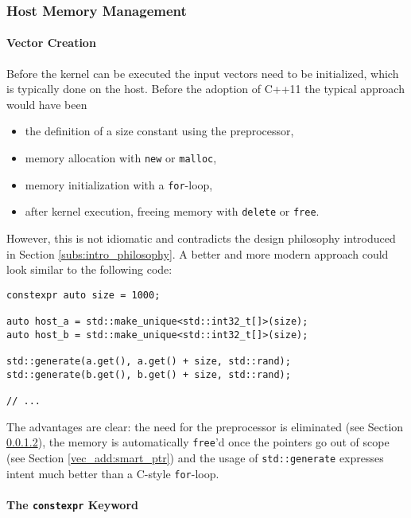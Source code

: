 \subsubsection{Host Memory Management}

\paragraph{Vector Creation}

Before the kernel can be executed the input vectors need to be initialized, which is typically done on the host. Before the adoption of C++11 the typical approach would have been
\begin{itemize}
\item the definition of a size constant using the preprocessor,
\item memory allocation with \texttt{new} or \texttt{malloc},
\item memory initialization with a \texttt{for}-loop,
\item after kernel execution, freeing memory with \texttt{delete} or \texttt{free}.
\end{itemize}

However, this is not idiomatic and contradicts the design philosophy introduced in Section \ref{subs:intro_philosophy}. A better and more modern approach could look similar to the following code:

\begin{lstlisting}
constexpr auto size = 1000;

auto host_a = std::make_unique<std::int32_t[]>(size);
auto host_b = std::make_unique<std::int32_t[]>(size);

std::generate(a.get(), a.get() + size, std::rand);
std::generate(b.get(), b.get() + size, std::rand);

// ...
\end{lstlisting}

The advantages are clear: the need for the preprocessor is eliminated (see Section \ref{vec_add:constexpr}), the memory is automatically \texttt{free}'d once the pointers go out of scope (see Section \ref{vec_add:smart_ptr}) and the usage of \texttt{std::generate} expresses intent much better than a C-style \texttt{for}-loop.

\paragraph{The \texttt{constexpr} Keyword}\label{vec_add:constexpr}

